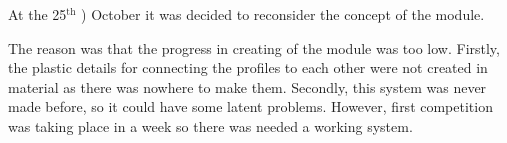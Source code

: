 \begin{enumerate*}
\begin{figure}[H]
\begin{minipage}[h]{0.31\linewidth}
  		\caption{}
  	\end{minipage}
  	\hfill
  	\begin{minipage}[h]{0.31\linewidth}
  		\caption{}
  	\end{minipage}
  \end{figure}

  \item At the 25$^\text{th}$ ) October it was decided to reconsider the concept of the module.

  The reason was that the progress in creating of the module was too low. Firstly, the plastic details for connecting the profiles to each other were not created in material as there was nowhere to make them. Secondly, this system was never made before, so it could have some latent problems. However, first competition was taking place in a week so there was needed a working system.


\end{enumerate*}
